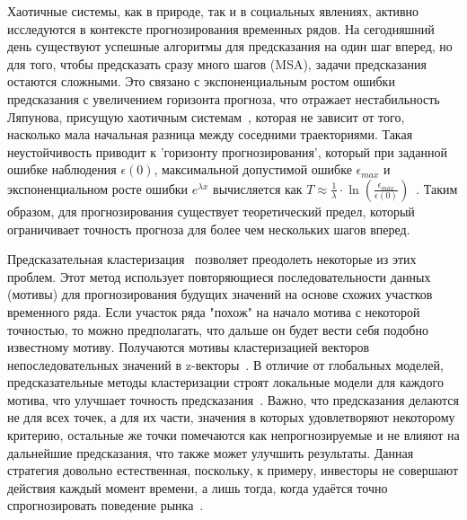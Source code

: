 \documentclass[a4paper, 12pt]{extarticle}
\begin{document}
Хаотичные системы, как в природе, так и в социальных явлениях, активно исследуются в контексте прогнозирования временных рядов. На сегодняшний день существуют успешные алгоритмы для предсказания на один шаг вперед, но для того, чтобы предсказать сразу много шагов (MSA), задачи предсказания остаются сложными. Это связано с экспоненциальным ростом ошибки предсказания с увеличением горизонта прогноза, что отражает нестабильность Ляпунова, присущую хаотичным системам~\cite{Kantz03}, которая не зависит от того, насколько мала начальная разница между соседними траекториями. Такая неустойчивость приводит к 'горизонту прогнозирования', который при заданной ошибке наблюдения $\epsilon(0)$, максимальной допустимой ошибке $\epsilon_{max}$ и экспоненциальном росте ошибки $e^{\lambda x}$ вычисляется как $T\approx \frac{1}{\lambda}\cdot\ln{\left(\frac{\epsilon_{max}}{\epsilon(0)}\right)}$~\cite{Potapov00}. Таким образом, для прогнозирования существует теоретический предел, который ограничивает точность прогноза для более чем нескольких шагов вперед.

Предсказательная кластеризация~\cite{Blockeel98} позволяет преодолеть некоторые из этих проблем. Этот метод использует повторяющиеся последовательности данных (мотивы) для прогнозирования будущих значений на основе схожих участков временного ряда. Если участок ряда "похож" на начало мотива с некоторой точностью, то можно предполагать, что дальше он будет вести себя подобно известному мотиву. Получаются мотивы кластеризацией векторов непоследовательных значений в z-векторы~\cite{Small05}. В отличие от глобальных моделей, предсказательные методы кластеризации строят локальные модели для каждого мотива, что улучшает точность предсказания~\cite{Taieb10}. Важно, что предсказания делаются не для всех точек, а для их части, значения в которых удовлетворяют некоторому критерию, остальные же точки помечаются как непрогнозируемые и не влияют на дальнейшие предсказания, что также может улучшить результаты. Данная стратегия довольно естественная, поскольку, к примеру, инвесторы не совершают действия каждый момент времени, а лишь тогда, когда удаётся точно спрогнозировать поведение рынка~\cite{Gromov15}.
\end{document}
